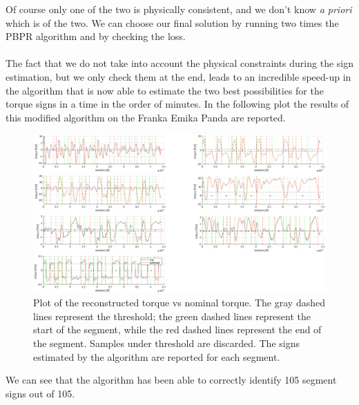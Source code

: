\documentclass{article}
\begin{document}
Of course only one of the two is physically consistent, and we don't know \emph{a priori} which is of the two. We can choose our final solution by running two times the PBPR algorithm and by checking the loss.\\\\
The fact that we do not take into account the physical constraints during the sign estimation, but we only check them at the end, leads to an incredible speed-up in the algorithm that is now able to estimate the two best possibilities for the torque signs in a time in the order of minutes.
In the following plot the results of this modified algorithm on the Franka Emika Panda are reported.
\FloatBarrier
\begin{figure}
\centering
\includegraphics[width=1\textwidth]{images/franka_result_crop.eps}
\caption{Plot of the reconstructed torque vs nominal torque. The gray dashed lines represent the threshold; the green dashed lines represent the start of the segment, while the red dashed lines represent the end of the segment. Samples under threshold are discarded. The signs estimated by the algorithm are reported for each segment.}
\end{figure}
\FloatBarrier

We can see that the algorithm has been able to correctly identify 105 segment signs out of 105.

\clearpage
\end{document}
